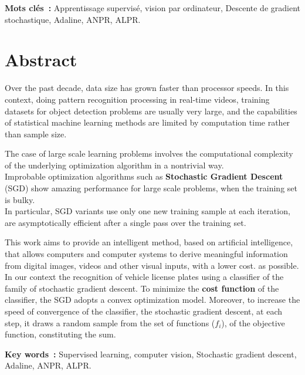 	\begin{center}
		
	\end{center}
	\textbf{Mots clés~:} Apprentissage supervisé, vision par ordinateur, Descente de gradient stochastique, Adaline, ANPR, ALPR. 

\endgroup			

\vfill

\pagebreak


\begingroup
\let\clearpage\relax
\let\cleardoublepage\relax
\let\cleardoublepage\relax

\chapter*{Abstract}
	Over the past decade, data size has grown faster than processor speeds. In this context, doing pattern recognition processing in real-time videos, training datasets for object detection problems are usually very large, and the capabilities of statistical machine learning methods are limited by computation time rather than sample size.
	
	The case of large scale learning problems involves the computational complexity of the underlying optimization algorithm in a nontrivial way.\\
	Improbable optimization algorithms such as \textbf{Stochastic Gradient Descent} (SGD) show amazing performance for large scale problems, when the training set is bulky.\\
	In particular, SGD variants use only one new training sample at each iteration, are asymptotically efficient after a single pass over the training set.
	
	This work aims to provide an intelligent method, based on artificial intelligence, that allows computers and computer systems to derive meaningful information from digital images, videos and other visual inputs, with a lower cost. as possible. In our context the recognition of vehicle license plates using a classifier of the family of stochastic gradient descent. To minimize the \textbf{cost function} of the classifier, the SGD adopts a convex optimization model. Moreover, to increase the speed of convergence of the classifier, the stochastic gradient descent, at each step, it draws a random sample from the set of functions ($f_i$), of the objective function, constituting the sum.
	
	\begin{center}
		
	\end{center}
	\textbf{Key words~:} Supervised learning, computer vision, Stochastic gradient descent, Adaline, ANPR, ALPR.

	

\endgroup			

\vfill